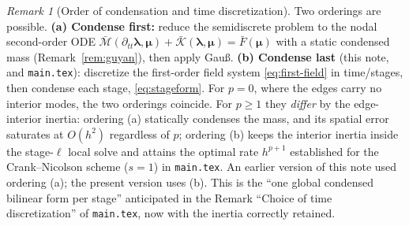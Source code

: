 \documentclass[11pt]{article}
\theoremstyle{remark}
\newtheorem*{remark}{Remark}
\renewcommand{\vec}{\boldsymbol}
\newcommand{\bvec}[1]{\vec{#1}}
\newcommand{\vldh}{\bvec\lambda}         %
\newcommand{\del}{\partial}
\newcommand{\Mbar}{\bar{\mathcal M}}     %
\newcommand{\Kbar}{\bar{\mathcal K}}     %
\begin{document}
\begin{remark}[Order of condensation and time discretization]
Two orderings are possible. \textbf{(a) Condense first:} reduce the semidiscrete
problem to the nodal second-order ODE
$\Mbar(\del_{tt}\vldh,\bvec\mu)+\Kbar(\vldh,\bvec\mu)=\bar F(\bvec\mu)$ with a
static condensed mass (Remark~\ref{rem:guyan}), then apply Gau\ss. \textbf{(b)
Condense last} (this note, and \texttt{main.tex}): discretize the first-order field
system \eqref{eq:first-field} in time/stages, then condense each stage,
\eqref{eq:stageform}. For $p=0$, where the edges carry no interior modes, the two
orderings coincide. For $p\ge1$ they \emph{differ} by the edge-interior inertia:
ordering (a) statically condenses the mass, and its spatial error saturates at
$O(h^2)$ regardless of $p$; ordering (b) keeps the interior inertia inside the
stage-$\ell$ local solve and attains the optimal rate $h^{p+1}$ established for the
Crank--Nicolson scheme ($s=1$) in \texttt{main.tex}. An earlier version of this
note used ordering (a); the present version uses (b). This is the ``one global
condensed bilinear form per stage'' anticipated in the Remark ``Choice of time
discretization'' of \texttt{main.tex}, now with the inertia correctly retained.
\end{remark}
\end{document}
